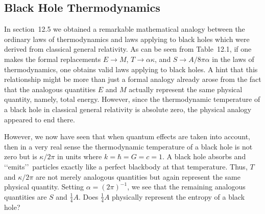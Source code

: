 
\subsection{Black Hole Thermodynamics}\label{sec:14.4}

In section~12.5 we obtained a remarkable mathematical analogy between the ordinary
laws of thermodynamics and laws applying to black holes which were derived from
classical general relativity. As can be seen from Table~12.1, if one makes the formal
replacements \(E\longrightarrow M\), \(T\longrightarrow\alpha\kappa\), and
\(S\longrightarrow A/8\pi\alpha\) in the laws of thermodynamics, one obtains valid
laws applying to black holes. A hint that this relationship might be more than just a
formal analogy already arose from the fact that the analogous quantities \(E\) and
\(M\) actually represent the same physical quantity, namely, total energy. However,
since the thermodynamic temperature of a black hole in classical general relativity is
absolute zero, the physical analogy appeared to end there.

However, we now have seen that when quantum effects are taken into account, then in
a very real sense the thermodynamic temperature of a black hole is not zero but is
\(\kappa/2\pi\) in units where \(k=\hbar=G=c=1\). A black hole absorbs and
\lq\lq emits\rq\rq\ particles exactly like a perfect blackbody at that temperature.
Thus, \(T\) and \(\kappa/2\pi\) are not merely analogous quantities but again
represent the same physical quantity. Setting \(\alpha=(2\pi)^{-1}\), we see that
the remaining analogous quantities are \(S\) and \(\frac14A\). Does
\(\frac14A\) physically represent the entropy of a black hole?

